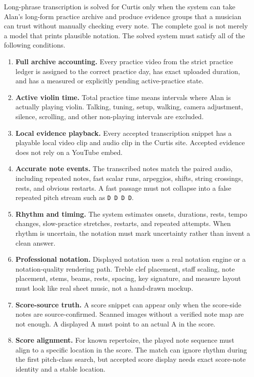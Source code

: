 Long-phrase transcription is solved for Curtis only when the system can take Alan's long-form practice archive and produce evidence groups that a musician can trust without manually checking every note. The complete goal is not merely a model that prints plausible notation. The solved system must satisfy all of the following conditions.

\begin{enumerate}
    \item \textbf{Full archive accounting.} Every practice video from the strict practice ledger is assigned to the correct practice day, has exact uploaded duration, and has a measured or explicitly pending active-practice state.
    \item \textbf{Active violin time.} Total practice time means intervals where Alan is actually playing violin. Talking, tuning, setup, walking, camera adjustment, silence, scrolling, and other non-playing intervals are excluded.
    \item \textbf{Local evidence playback.} Every accepted transcription snippet has a playable local video clip and audio clip in the Curtis site. Accepted evidence does not rely on a YouTube embed.
    \item \textbf{Accurate note events.} The transcribed notes match the paired audio, including repeated notes, fast scalar runs, arpeggios, shifts, string crossings, rests, and obvious restarts. A fast passage must not collapse into a false repeated pitch stream such as \texttt{D D D D}.
    \item \textbf{Rhythm and timing.} The system estimates onsets, durations, rests, tempo changes, slow-practice stretches, restarts, and repeated attempts. When rhythm is uncertain, the notation must mark uncertainty rather than invent a clean answer.
    \item \textbf{Professional notation.} Displayed notation uses a real notation engine or a notation-quality rendering path. Treble clef placement, staff scaling, note placement, stems, beams, rests, spacing, key signature, and measure layout must look like real sheet music, not a hand-drawn mockup.
    \item \textbf{Score-source truth.} A score snippet can appear only when the score-side notes are source-confirmed. Scanned images without a verified note map are not enough. A displayed A must point to an actual A in the score.
    \item \textbf{Score alignment.} For known repertoire, the played note sequence must align to a specific location in the score. The match can ignore rhythm during the first pitch-class search, but accepted score display needs exact score-note identity and a stable location.

\end{enumerate}
